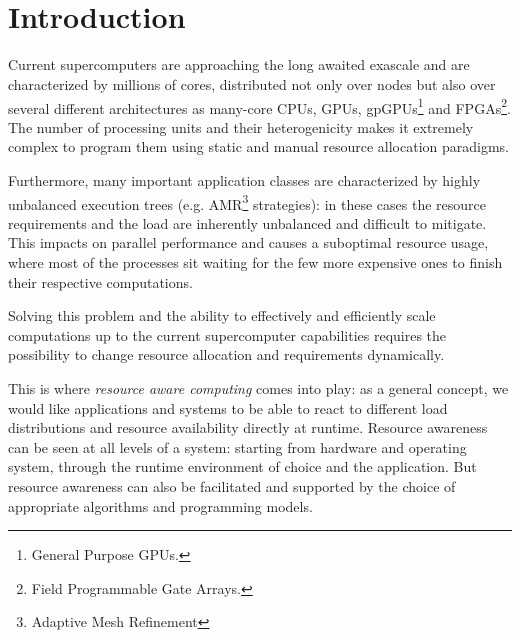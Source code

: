
~\\~
\section{Introduction}
\enlargethispage{-1\baselineskip} %

Current supercomputers are approaching the long awaited exascale and are characterized by millions of cores, distributed not only over nodes but also over several different architectures as many-core CPUs, GPUs, gpGPUs\footnote{General Purpose GPUs.} and FPGAs\footnote{Field Programmable Gate Arrays.}.
The number of processing units and their heterogenicity makes it extremely complex to program them using static and manual resource allocation paradigms.

Furthermore, many important application classes are characterized by highly unbalanced execution trees (e.g. AMR\footnote{Adaptive Mesh Refinement} strategies): in these cases the resource requirements and the load are inherently unbalanced and difficult to mitigate.
This impacts on parallel performance and causes a suboptimal resource usage, where most of the processes sit waiting for the few more expensive ones to finish their respective computations.

Solving this problem and the ability to effectively and efficiently scale computations up to the current supercomputer capabilities requires the possibility to change resource allocation and requirements dynamically.

This is where \emph{resource aware computing} comes into play: as a general concept, we would like applications and systems to be able to react to different load distributions and resource availability directly at runtime. Resource awareness can be seen at all levels of a system: starting from hardware and operating system, through the runtime environment of choice and the application. But resource awareness can also be facilitated and supported by the choice of appropriate algorithms and programming models.

